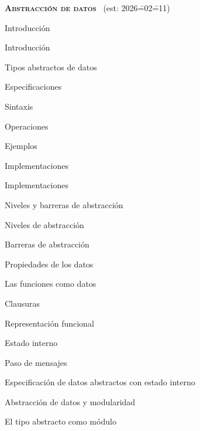 \begin{longenum}
\begin{longenum}
    \end{longenum}
    \item \textbf{\textsc{Abstracción de datos}} \ (est: 2026\==02\==11)
    \begin{longenum}
        \item Introducción
        \begin{longenum}
            \item Introducción
            \item Tipos abstractos de datos
        \end{longenum}
        \item Especificaciones
        \begin{longenum}
            \item Sintaxis
            \item Operaciones
            \item Ejemplos
        \end{longenum}
        \item Implementaciones
        \begin{longenum}
            \item Implementaciones
        \end{longenum}
        \item Niveles y barreras de abstracción
        \begin{longenum}
            \item Niveles de abstracción
            \item Barreras de abstracción
            \item Propiedades de los datos
        \end{longenum}
        \item Las funciones como datos
        \begin{longenum}
            \item Clausuras
            \item Representación funcional
            \item Estado interno
            \item Paso de mensajes
            \item Especificación de datos abstractos con estado interno
        \end{longenum}
        \item Abstracción de datos y modularidad
        \begin{longenum}
            \item El tipo abstracto como módulo
        \end{longenum}

\end{longenum}
\end{longenum}
